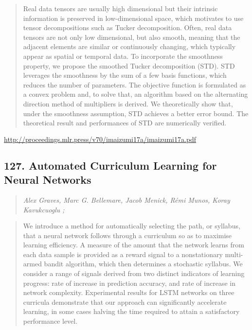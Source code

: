 \documentclass{article}
\begin{document}
\begin{quote}
    Real data tensors are usually high dimensional but their intrinsic information is preserved in low-dimensional space, which motivates to use tensor decompositions such as Tucker decomposition. Often, real data tensors are not only low dimensional, but also smooth, meaning that the adjacent elements are similar or continuously changing, which typically appear as spatial or temporal data. To incorporate the smoothness property, we propose the smoothed Tucker decomposition (STD). STD leverages the smoothness by the sum of a few basis functions, which reduces the number of parameters. The objective function is formulated as a convex problem and, to solve that, an algorithm based on the alternating direction method of multipliers is derived. We theoretically show that, under the smoothness assumption, STD achieves a better error bound. The theoretical result and performances of STD are numerically verified.  
\end{quote}

\href{http://proceedings.mlr.press/v70/imaizumi17a/imaizumi17a.pdf}{http://proceedings.mlr.press/v70/imaizumi17a/imaizumi17a.pdf}

\subsection{127. Automated Curriculum Learning for Neural Networks}

\begin{quote}
\footnotesize{\textit{Alex Graves, Marc G. Bellemare, Jacob Menick, Rémi Munos, Koray Kavukcuoglu ;}}

\end{quote}

\begin{quote}
    We introduce a method for automatically selecting the path, or syllabus, that a neural network follows through a curriculum so as to maximise learning efficiency. A measure of the amount that the network learns from each data sample is provided as a reward signal to a nonstationary multi-armed bandit algorithm, which then determines a stochastic syllabus. We consider a range of signals derived from two distinct indicators of learning progress: rate of increase in prediction accuracy, and rate of increase in network complexity. Experimental results for LSTM networks on three curricula demonstrate that our approach can significantly accelerate learning, in some cases halving the time required to attain a satisfactory performance level.  
\end{quote}
\end{document}

